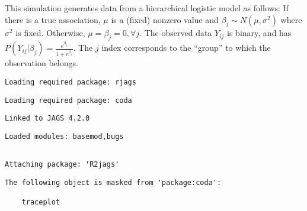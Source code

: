 \documentclass[12pt,twoside]{dukestatscithesis}
\theoremstyle{definition}
\theoremstyle{definition}
\theoremstyle{definition}
\theoremstyle{remark}
\begin{document}
This simulation generates data from a hierarchical logistic model as
follows: If there is a true association, \(\mu\) is a (fixed) nonzero
value and \(\beta_j \sim N(\mu, \sigma^2)\) where \(\sigma^2\) is fixed.
Otherwise, \(\mu=\beta_j = 0, \forall j\). The observed data \(Y_{ij}\)
is binary, and has
\(P(Y_{ij}| \beta_j) = \frac{e^{\beta_j}}{1+e^{\beta_j}}\). The \(j\)
index corresponds to the ``group'' to which the observation belongs.
\begin{Shaded}
\begin{Highlighting}[]
\OperatorTok{::}\OperatorTok{$}\NormalTok{(} \NormalTok{)}
\OperatorTok{::}\OperatorTok{$}\NormalTok{(} \NormalTok{)}
\NormalTok{(}\NormalTok{)}
\end{Highlighting}
\end{Shaded}
\begin{verbatim}
Loading required package: rjags
\end{verbatim}
\begin{verbatim}
Loading required package: coda
\end{verbatim}
\begin{verbatim}
Linked to JAGS 4.2.0
\end{verbatim}
\begin{verbatim}
Loaded modules: basemod,bugs
\end{verbatim}
\begin{verbatim}

Attaching package: 'R2jags'
\end{verbatim}
\begin{verbatim}
The following object is masked from 'package:coda':

    traceplot
\end{verbatim}
\end{document}
